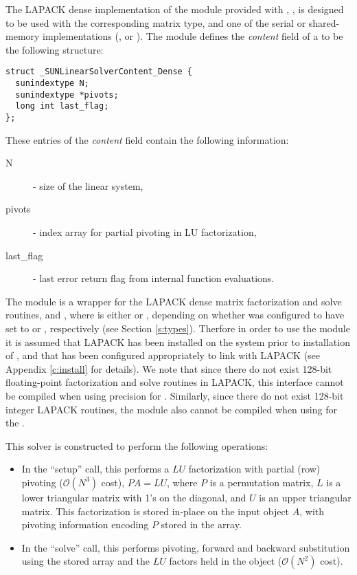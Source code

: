
The LAPACK dense implementation of the {\sunlinsol} module provided
with {\sundials}, {\sunlinsollapdense}, is designed to be used with the 
corresponding {\sunmatdense} matrix type, and one of the serial or
shared-memory {\nvector} implementations ({\nvecs}, {\nvecopenmp} or
{\nvecpthreads}).  The {\sunlinsollapdense} module defines the {\em
content} field of a  to be the following structure:
\begin{verbatim} 
struct _SUNLinearSolverContent_Dense {
  sunindextype N;
  sunindextype *pivots;
  long int last_flag;
};
\end{verbatim}
These entries of the \emph{content} field contain the following
information:
\begin{description}
  \item[N] - size of the linear system,
  \item[pivots] - index array for partial pivoting in LU factorization,
  \item[last\_flag] - last error return flag from internal function evaluations.
\end{description}

{\warn} The {\sunlinsollapdense} module is a {\sunlinsol} wrapper for
the LAPACK dense matrix factorization and solve routines, 
and , where \id{*} is either  or , depending on
whether {\sundials} was configured to have  set to
 or , respectively (see Section \ref{s:types}).
Therfore in order to use the {\sunlinsollapdense} module it is assumed
that LAPACK has been installed on the system prior to installation of
{\sundials}, and that {\sundials} has been configured appropriately to
link with LAPACK (see Appendix \ref{c:install} for details).  
We note that since there do not exist 128-bit floating-point
factorization and solve routines in LAPACK, this interface cannot be
compiled when using  precision for .
Similarly, since there do not exist 128-bit integer LAPACK routines,
the {\sunlinsollapdense} module also cannot be compiled when using
 for the .

This solver is constructed to perform the following operations:
\begin{itemize}
\item In the ``setup'' call, this performs a $LU$ factorization with
  partial (row) pivoting ($\mathcal O(N^3)$ cost), $PA=LU$, where $P$
  is a permutation matrix, $L$ is a lower triangular matrix with 1's
  on the diagonal, and $U$ is an upper triangular matrix.  This
  factorization is stored in-place on the input {\sunmatdense} object
  $A$, with pivoting information encoding $P$ stored in
  the  array.
\item In the ``solve'' call, this performs pivoting, forward and
  backward substitution using the stored  array and the
  $LU$ factors held in the {\sunmatdense} object ($\mathcal O(N^2)$
  cost).
\end{itemize}

